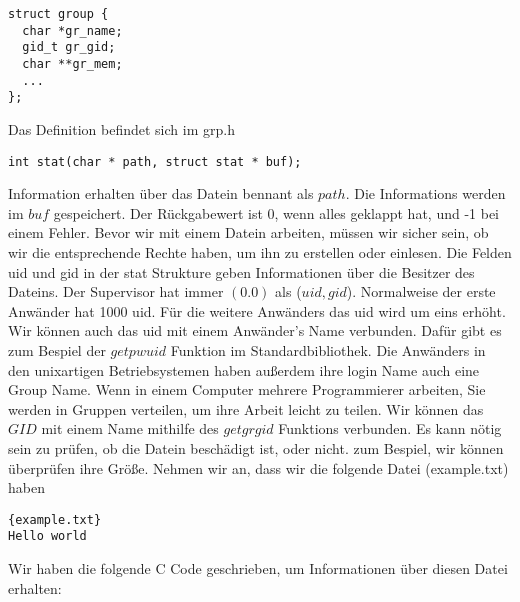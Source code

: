 \documentclass{article}[12pt]
\newenvironment{myexampleblock}[1]{%
    \tcolorbox[beamer,%
    noparskip,breakable,
    colback=White,colframe=ForestGreen,%
    colbacklower=LimeGreen!75!White,%
    title=#1]}%
    {\endtcolorbox}
\begin{document}
\begin{myexampleblock}{Definition: \texttt{struct group}}
\begin{lstlisting}
struct group {
  char *gr_name;
  gid_t gr_gid;
  char **gr_mem;
  ...
};
\end{lstlisting}
\vspace{-0.4cm}
Das Definition befindet sich im grp.h
\end{myexampleblock}
\begin{myexampleblock}{Funktion: \texttt{stat}}
\begin{lstlisting}
int stat(char * path, struct stat * buf);
\end{lstlisting}
\vspace{-.4cm}
Information erhalten über das Datein bennant als $path$. Die Informations werden im $buf$ gespeichert.
Der Rückgabewert ist 0, wenn alles geklappt hat, und -1 bei einem Fehler.
\end{myexampleblock}
Bevor wir mit einem Datein arbeiten, müssen wir sicher sein, ob wir die entsprechende Rechte haben, um ihn zu 
erstellen oder einlesen. Die Felden uid und gid in der stat Strukture geben Informationen über die Besitzer des Dateins.
Der Supervisor hat immer $(0.0)$ als ($uid,gid$). Normalweise der erste Anwänder hat 1000 uid.
Für die weitere Anwänders das uid wird um eins erhöht. 
Wir können auch das uid mit einem Anwänder's Name verbunden. Dafür gibt es zum Bespiel der $getpwuid$ Funktion 
im Standardbibliothek. Die Anwänders in den unixartigen Betriebsystemen haben außerdem ihre login Name auch eine
Group Name. Wenn in einem Computer mehrere Programmierer arbeiten, Sie werden in Gruppen verteilen, um ihre
Arbeit leicht zu teilen. Wir können das $GID$ mit einem Name mithilfe des $getgrgid$ Funktions verbunden.
Es kann nötig sein zu prüfen, ob die Datein beschädigt ist, oder nicht. 
zum Bespiel, wir können überprüfen ihre Größe. Nehmen wir an, dass wir die folgende Datei (example.txt) haben
\begin{lstlisting}{example.txt}
Hello world
\end{lstlisting}
Wir haben die folgende C Code geschrieben, um Informationen über diesen Datei erhalten:
\end{document}
